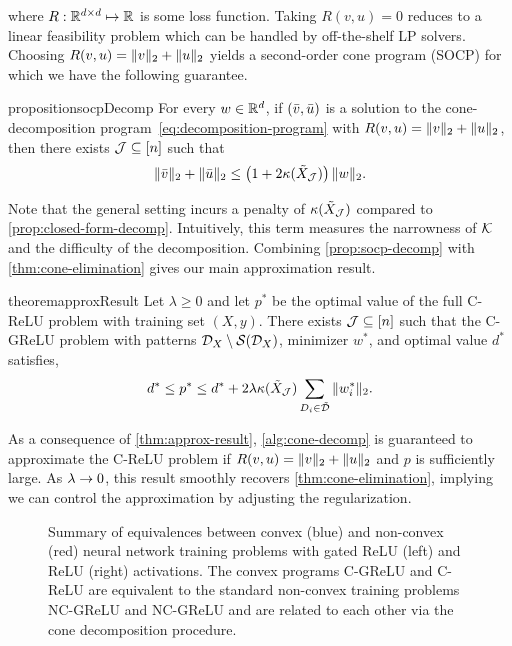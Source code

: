 where \( R : \mathbb{R}^{d \times d} \mapsto \mathbb{R} \) is some loss function.
Taking \( R(v, u) = 0 \) reduces to a linear feasibility problem which can be
handled by off-the-shelf LP solvers.
Choosing \( R(v,u) = \|v\|_2 + \|u\|_2 \) yields a second-order cone
program (SOCP) for which we have the following guarantee.
\begin{restatable}{proposition}{socpDecomp}\label{prop:socp-decomp}
    For every \( w \in \mathbb{R}^d \), if \( \left(\bar v, \bar u\right) \) is a solution to
    the cone-decomposition program~\eqref{eq:decomposition-program} with
    \( R(v,u) = \|v\|_2 + \|u\|_2 \), then there exists \( \mathcal{J} \subseteq [n] \) such that
    \[
        \|\bar v\|_2 + \|\bar u\|_2 \leq \left(1 + 2 \kappa(\tilde X_{\mathcal{J}})\right) \|w\|_2.
    \]
\end{restatable}

Note that the general setting incurs a penalty of \( \kappa(\tilde X_{\mathcal{J}})
\) compared to \cref{prop:closed-form-decomp}.
Intuitively, this term measures the narrowness of \( \mathcal{K} \) and the difficulty of the decomposition.
Combining \cref{prop:socp-decomp} with \cref{thm:cone-elimination} gives our main approximation result.
\begin{restatable}{theorem}{approxResult}\label{thm:approx-result}
    Let \( \lambda \geq 0 \) and let \( p^* \) be the optimal value of the full
    C-ReLU problem with training set \( (X, y) \).
    There exists \( \mathcal{J} \subseteq [n] \) such that the C-GReLU problem with
    patterns \( \mathcal{D}_X \setminus \mathcal{S}(\mathcal{D}_X) \), minimizer \( w^* \),
    and optimal value \( d^* \) satisfies,
    \[
        d^*
        \leq p^*
        \leq d^*
        + 2 \lambda \kappa(\tilde X_{\mathcal{J}}) \sum_{D_i \in \tilde {\mathcal{D}}} \|w_i^*\|_2.
    \]
\end{restatable}
As a consequence of \cref{thm:approx-result}, \cref{alg:cone-decomp} is
guaranteed to approximate the C-ReLU problem if 
\( R(v,u) = \|v\|_2 + \|u\|_2 \) and \( p \) is sufficiently large.
As \( \lambda \rightarrow 0 \), this result smoothly recovers
\cref{thm:cone-elimination}, implying we can control the approximation by
adjusting the regularization.

\begin{figure}
    \centering
    
    \caption{Summary of equivalences between convex (blue) and non-convex (red) neural
        network training problems with gated ReLU (left) and ReLU (right)
        activations.
        The convex programs C-GReLU and C-ReLU are equivalent to the standard
        non-convex training problems NC-GReLU and NC-GReLU and are related to
        each other via the cone decomposition procedure.
    }%
    \label{fig:relations}
\end{figure}
